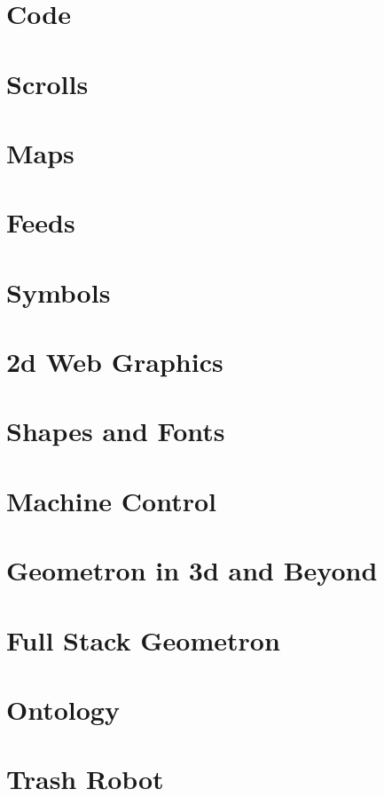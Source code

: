\documentclass[ebook,12pt,openany]{memoir} %
\begin{document}
\chapter{Code}

\chapter{Scrolls}

\chapter{Maps}

\chapter{Feeds}

\chapter{Symbols}

\chapter{2d Web Graphics}

\chapter{Shapes and Fonts}

\chapter{Machine Control}

\chapter{Geometron in 3d and Beyond}

\chapter{Full Stack Geometron}

\chapter{Ontology}

\chapter{Trash Robot}



\end{document}
